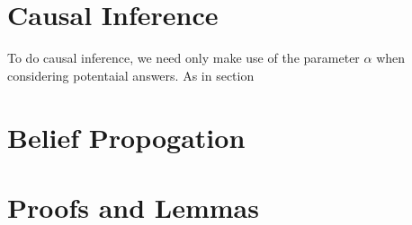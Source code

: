 \documentclass{article}
\theoremstyle{plain}
\theoremstyle{definition}
\theoremstyle{remark}
\begin{document}


\section{Causal Inference}
To do causal inference, we need only make use of the parameter $\alpha$ when considering
potentaial answers. As in section 


\section{Belief Propogation}
% 



\appendix
\section{Proofs and Lemmas}
\end{document}
